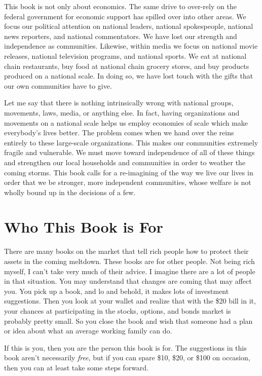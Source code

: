 This book is not only about economics. The same drive to over-rely on
the federal government for economic support has spilled over into other
areas. We focus our political attention on national leaders, national
spokespeople, national news reporters, and national commentators. We
have lost our strength and independence as communities. Likewise,
within media we focus on national movie releases, national television
programs, and national sports. We eat at national chain restaurants,
buy food at national chain grocery stores, and buy products produced on
a national scale. In doing so, we have lost touch with the gifts that
our own communities have to give. 

Let me say that there is nothing intrinsically wrong with national
groups, movements, laws, media, or anything else. In fact, having
organizations and movements on a national scale helps us employ
economies of scale which make everybody’s lives better. The problem
comes when we hand over the reins entirely to these large-scale
organizations. This makes our communities extremely fragile and
vulnerable. We must move toward independence of all of these things and
strengthen our local households and communities in order to weather the
coming storms. This book calls for a re-imagining of the way we live
our lives in order that we be stronger, more independent communities,
whose welfare is not wholly bound up in the decisions of a few.

\section{Who This Book is For}

There are many books on the market that tell rich people how to protect
their assets in the coming meltdown. These books are for other people.
Not being rich
myself, I can’t take
very much of their advice. I imagine there are a lot of people in that
situation. You may understand that changes are coming that may affect
you. You pick up a book, and lo and behold, it makes lots of investment
suggestions. Then you look at your wallet and realize that with the
\$20 bill in it, your chances at participating in the stocks, options,
and bonds market is probably pretty small. So you close the book and
wish that someone had a plan or idea about what an average working
family can do.

If this is you, then you are the person this book is for. The
suggestions in this book aren’t necessarily \textit{free}, but if you
can spare \$10, \$20, or \$100 on occasion, then you can at least take
some steps forward.

